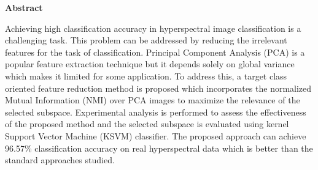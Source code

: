 \documentclass[document.tex]{subfiles}
\begin{document}
	\begin{center}
		\textbf{{\fontsize{16pt}{18}\selectfont Abstract}}
		\vspace{1cm}
	\end{center}
Achieving high classification accuracy in hyperspectral image classification is a challenging task. This problem can be addressed by reducing the irrelevant features for the task of classification. Principal Component Analysis (PCA) is a popular feature extraction technique but it depends solely on global variance which makes it limited for some application. To address this, a target class oriented feature reduction method is proposed which incorporates the normalized Mutual Information (NMI) over PCA images to maximize the relevance of the selected subspace. Experimental analysis is performed to assess the effectiveness of the proposed method and the selected subspace is evaluated using kernel Support Vector Machine (KSVM) classifier. The proposed approach can achieve 96.57\% classification accuracy on real hyperspectral data which is better than the standard approaches studied.
	\clearpage
	
\end{document}
